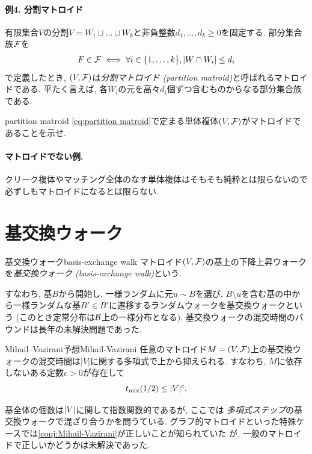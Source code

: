 \paragraph*{例4. 分割マトロイド}
有限集合$V$の分割$V=W_1\sqcup \dots \sqcup W_k$と非負整数$d_1,\dots,d_k\ge 0$を固定する.
部分集合族$\mathcal{F}$を
\begin{align}
    F \in \mathcal{F} \iff \forall i\in\{1,\dots,k\},\lvert W \cap W_i\rvert \le d_i     \label{eq:partition matroid}
\end{align}
で定義したとき, $(V,\mathcal{F})$は\emph{分割マトロイド (partition matroid)}と呼ばれるマトロイドである.
平たく言えば, 各$W_i$の元を高々$d_i$個ずつ含むものからなる部分集合族である.

\begin{exercise}{}{partition matroid}
    \cref{eq:partition matroid}で定まる単体複体$(V,\mathcal{F})$がマトロイドであることを示せ.
\end{exercise}

\paragraph*{マトロイドでない例.}
クリーク複体やマッチング全体のなす単体複体はそもそも純粋とは限らないので必ずしもマトロイドになるとは限らない.

\section{基交換ウォーク}
\begin{definition}{基交換ウォーク}{basis-exchange walk}
    マトロイド$(V,\mathcal{F})$の基上の下降上昇ウォークを\emph{基交換ウォーク (basis-exchange walk)}という.
\end{definition}
すなわち, 基$B$から開始し,
一様ランダムに元$u\sim B$を選び,
$B\setminus u$を含む基の中から一様ランダムな基$B'\in B'$に遷移するランダムウォークを基交換ウォークという (このとき定常分布は$\mathcal{B}$上の一様分布となる).
基交換ウォークの混交時間のバウンドは長年の未解決問題であった.
\begin{conjecture}{Mihail--Vazirani予想}{Mihail-Vazirani}
    任意のマトロイド$M=(V,\mathcal{F})$上の基交換ウォークの混交時間は$|V|$に関する多項式で上から抑えられる.
    すなわち, $M$に依存しないある定数$c>0$が存在して
    \[
        t_{\mathrm{mix}}(1/2) \le |V|^c.
    \]
\end{conjecture}
基全体の個数は$\lvert V\rvert$に関して指数関数的であるが,
ここでは
\emph{多項式ステップ}の基交換ウォークで混ざり合うかを問うている.
グラフ的マトロイドといった特殊ケースでは\cref{conj:Mihail-Vazirani}が正しいことが知られていた
\cite{balanced_matroids}が, 一般のマトロイドで正しいかどうかは未解決であった.

